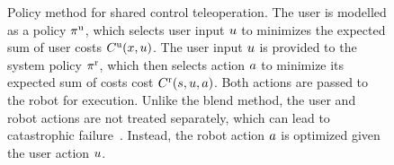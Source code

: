 \begin{figure}
 \caption{Policy method for shared control teleoperation. The user is modelled as a policy $\pi^{\text{u}}$, which selects user input $u$ to minimizes the expected sum of user costs $C^{\text{u}}(x, u)$. The user input $u$ is provided to the system policy $\pi^{\text{r}}$, which then selects action $a$ to minimize its expected sum of costs cost $C^{\text{r}}(s, u, a)$. Both actions are passed to the robot for execution. Unlike the blend method, the user and robot actions are not treated separately, which can lead to catastrophic failure~\citep{trautman_2015}. Instead, the robot action $a$ is optimized given the user action $u$.}
  \label{fig:policy_diagram}
\end{figure}
